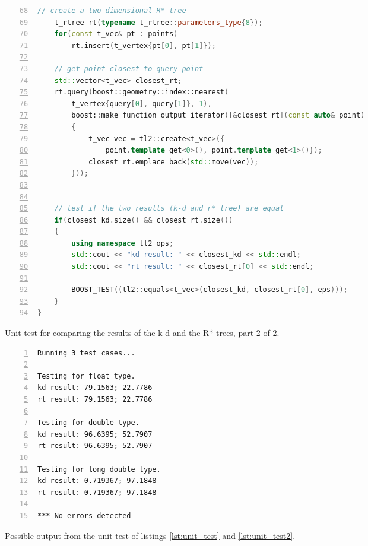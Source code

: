 \begin{listing}[htb]
	\begin{lstlisting}[language = C++,
			basicstyle = {\scriptsize},
			breaklines = true, tabsize = 4,
			numbers = left, firstnumber = 68, numberstyle={\scriptsize}]
	// create a two-dimensional R* tree
	t_rtree rt(typename t_rtree::parameters_type{8});
	for(const t_vec& pt : points)
		rt.insert(t_vertex{pt[0], pt[1]});

	// get point closest to query point
	std::vector<t_vec> closest_rt;
	rt.query(boost::geometry::index::nearest(
		t_vertex{query[0], query[1]}, 1),
		boost::make_function_output_iterator([&closest_rt](const auto& point)
		{
			t_vec vec = tl2::create<t_vec>({
				point.template get<0>(), point.template get<1>()});
			closest_rt.emplace_back(std::move(vec));
		}));


	// test if the two results (k-d and r* tree) are equal
	if(closest_kd.size() && closest_rt.size())
	{
		using namespace tl2_ops;
		std::cout << "kd result: " << closest_kd << std::endl;
		std::cout << "rt result: " << closest_rt[0] << std::endl;

		BOOST_TEST((tl2::equals<t_vec>(closest_kd, closest_rt[0], eps)));
	}
}
	\end{lstlisting}
	\caption[Unit test 2/2]{Unit test for comparing the results of the k-d and the R* trees, part 2 of 2.
	\label{lst:unit_test2}}
\end{listing}


\begin{listing}[htb]
	\begin{lstlisting}[basicstyle = {\scriptsize},
			breaklines = true, tabsize = 4,
			numbers = left, numberstyle={\scriptsize}]
Running 3 test cases...

Testing for float type.
kd result: 79.1563; 22.7786
rt result: 79.1563; 22.7786

Testing for double type.
kd result: 96.6395; 52.7907
rt result: 96.6395; 52.7907

Testing for long double type.
kd result: 0.719367; 97.1848
rt result: 0.719367; 97.1848

*** No errors detected
	\end{lstlisting}
	\caption[Unit test output]{Possible output from the unit test of listings \ref{lst:unit_test} and \ref{lst:unit_test2}.
	\label{lst:unit_test_output}}
\end{listing}
